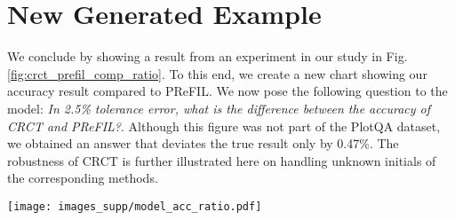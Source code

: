 \documentclass[runningheads]{llncs}
\newcommand\our[1][]{CRCT\xspace}
\begin{document}
\section{New Generated Example}
\label{sec:new_gen_sample}
We conclude by showing a result from an experiment in our study in Fig. \ref{fig:crct_prefil_comp_ratio}. To this end, we create a new chart showing our accuracy result compared to PReFIL. We now pose the following question to the model: {\it In 2.5\% tolerance error, what is the difference between the accuracy of CRCT and PReFIL?}. Although this figure was not part of the PlotQA dataset, we obtained an answer that deviates the true result only by 0.47\%. The robustness of CRCT is further illustrated here on handling unknown initials of the corresponding methods.

\begin{figure*}[ht]
\begin{center}
\texttt{[image: images\_supp/model\_acc\_ratio.pdf]}
\end{center}
   \caption{We insert into CRCT a result from our paper showing the regression accuracy of our model against PReFIL. We pose the following question: {\it In 2.5\% tolerance error, what is the difference between the accuracy of \textbf{CRCT} and \textbf{PReFIL}?}. Ground truth: 23.978. \our: \textcolor{ForestGreen}{23.865} (\textcolor{Red}{-0.47\%}).}
\label{fig:crct_prefil_comp_ratio}
\end{figure*}
\clearpage
\newpage 
\end{document}

